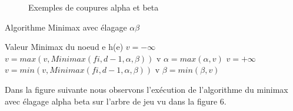\documentclass[11pt]{article}
\newcommand{\algorithmicoutput}{\textbf{Sortie:}}
\newcommand{\Output}{\item[\algorithmicoutput]}
\begin{document}
\begin{figure}[h]
  \caption {Exemples de coupures alpha et beta}
  \noindent{}
\end{figure}

\begin{algorithm}
  \caption{Algorithme Minimax avec élagage $\alpha \beta$}

  \begin{algorithmic}
  	\Statex{}
  	\Output{Valeur Minimax du noeud e}
        \Return h(e)
      \Else
          \State $v = -\infty$
            \State $v = max(v, Minimax(fi, d-1, \alpha, \beta))$
             \Return v \EndIf
            \State $\alpha = max(\alpha, v)$
          \EndFor
	    \Else 
          \State $v = +\infty$
            \State $v = min(v, Minimax(fi, d-1, \alpha, \beta))$
             \Return v \EndIf
            \State $\beta = min(\beta, v)$
          \EndFor
	    \EndIf
	  \EndIf
    \EndFunction
  \end{algorithmic}
\end{algorithm}

Dans la figure suivante nous observons l'exécution de l'algorithme du
minimax avec élagage alpha beta sur l'arbre de jeu vu dans la figure 6.
\end{document}
